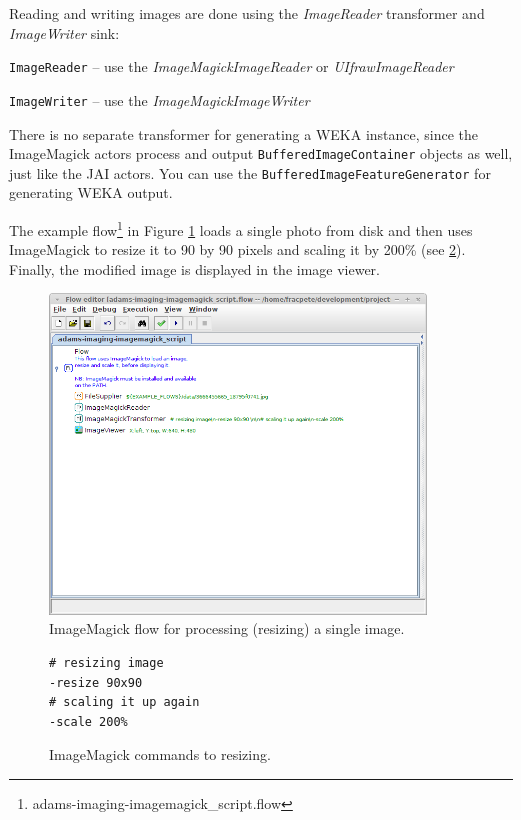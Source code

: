\documentclass[a4paper]{book}
\begin{document}
Reading and writing images are done using the \textit{ImageReader} transformer
and \textit{ImageWriter} sink:
\begin{tight_itemize}
	\item \texttt{ImageReader} -- use the \textit{ImageMagickImageReader} or \textit{UIfrawImageReader}
	\item \texttt{ImageWriter} -- use the \textit{ImageMagickImageWriter}
\end{tight_itemize}

There is no separate transformer for generating a WEKA instance, since the
ImageMagick actors process and output \texttt{BufferedImageContainer} objects as
well, just like the JAI actors. You can use the \texttt{BufferedImageFeatureGenerator} for
generating WEKA output.

The example flow\footnote{adams-imaging-imagemagick\_script.flow} in Figure
\ref{imagemagick-resize-flow} loads a single photo from disk and then uses
ImageMagick to resize it to 90 by 90 pixels and scaling it by 200\% (see
\ref{imagemagick-resize-script}). Finally, the modified image is displayed in
the image viewer.

\begin{figure}[htb]
  \centering
  \includegraphics[width=10.0cm]{images/imagemagick-resize-flow.png}
  \caption{ImageMagick flow for processing (resizing) a single image.}
  \label{imagemagick-resize-flow}
\end{figure}

\begin{figure}[htb]
  \begin{center}
  \begin{varwidth}{\textwidth}
\begin{verbatim}
# resizing image
-resize 90x90
# scaling it up again
-scale 200%
\end{verbatim}
  \end{varwidth}
  \end{center}
  \caption{ImageMagick commands to resizing.}
  \label{imagemagick-resize-script}
\end{figure}
\end{document}
